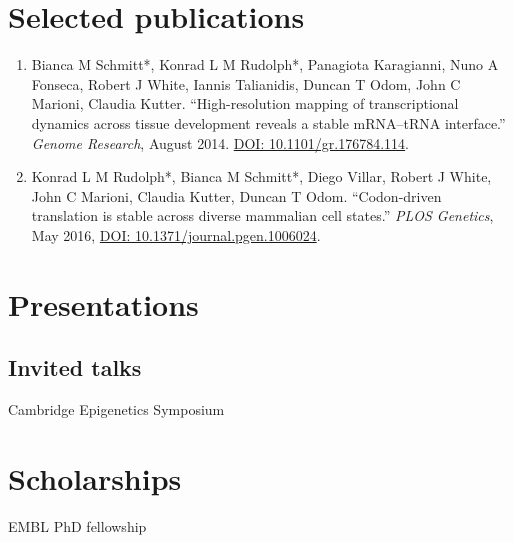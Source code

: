 \documentclass{klmr-cv}
\begin{document}
\section{Selected publications}


\begin{enumerate}
    \item Bianca M Schmitt*, Konrad L M Rudolph*, Panagiota Karagianni,
        Nuno A Fonseca, Robert J White, Iannis Talianidis, Duncan T Odom,
        John C Marioni, Claudia Kutter. “High-resolution mapping of
        transcriptional dynamics across tissue development reveals a stable
        mRNA--tRNA interface.” \textit{Genome Research}, August 2014.
        \href{http://dx.doi.org/10.1101/gr.176784.114}{DOI:
        10.1101/gr.176784.114}.

    \item Konrad L M Rudolph*, Bianca M Schmitt*, Diego Villar, Robert J
        White, John C Marioni, Claudia Kutter, Duncan T Odom. “Codon-driven
        translation is stable across diverse mammalian cell states.”
        \textit{PLOS Genetics}, May 2016,
        \href{http://dx.doi.org/10.1371/journal.pgen.1006024}{DOI:
        10.1371/journal.pgen.1006024}.
\end{enumerate}

\section{Presentations}

\subsection{Invited talks}

\date{2014}
Cambridge Epigenetics Symposium

\section{Scholarships}

EMBL PhD fellowship
\end{document}
